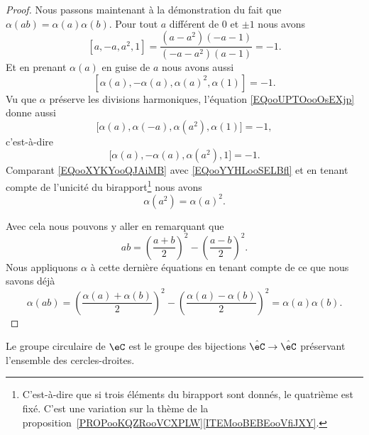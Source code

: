 \begin{proof}
	Nous passons maintenant à la démonstration du fait que \( \alpha(ab)=\alpha(a)\alpha(b)\). Pour tout \( a\) différent de \( 0\) et \( \pm 1\) nous avons
	\begin{equation}        \label{EQooUPTOooOsEXjp}
		[a,-a,a^2,1]=\frac{ (a-a^2)(-a-1) }{ (-a-a^2)(a-1) }=-1.
	\end{equation}
	Et en prenant \( \alpha(a)\) en guise de \( a\) nous avons aussi
	\begin{equation}        \label{EQooXYKYooQJAiMB}
		[\alpha(a),-\alpha(a),\alpha(a)^2,\alpha(1)]=-1.
	\end{equation}
	Vu que \( \alpha\) préserve les divisions harmoniques, l'équation \eqref{EQooUPTOooOsEXjp} donne aussi
	\begin{equation}
		\big[ \alpha(a),\alpha(-a),\alpha(a^2),\alpha(1) \big]=-1,
	\end{equation}
	c'est-à-dire
	\begin{equation}    \label{EQooYYHLooSELBfl}
		\big[ \alpha(a),-\alpha(a),\alpha(a^2),1 \big]=-1.
	\end{equation}
	Comparant \eqref{EQooXYKYooQJAiMB} avec \eqref{EQooYYHLooSELBfl} et en tenant compte de l'unicité du birapport\footnote{C'est-à-dire que si trois éléments du birapport sont donnés, le quatrième est fixé. C'est une variation sur la thème de la proposition~\ref{PROPooKQZRooVCXPLW}\ref{ITEMooBEBEooVfiJXY}.} nous avons
	\begin{equation}
		\alpha(a^2)=\alpha(a)^2.
	\end{equation}

	Avec cela nous pouvons y aller en remarquant que
	\begin{equation}
		ab=\left( \frac{ a+b }{2} \right)^2-\left( \frac{ a-b }{2} \right)^2.
	\end{equation}
	Nous appliquons \( \alpha\) à cette dernière équations en tenant compte de ce que nous savons déjà
	\begin{equation}
		\alpha(ab)=\left( \frac{ \alpha(a)+\alpha(b) }{2} \right)^2-\left( \frac{ \alpha(a)-\alpha(b) }{2} \right)^2=\alpha(a)\alpha(b).
	\end{equation}
\end{proof}

\begin{theorem}       \label{THOooKMKWooZPIDaK}
	Le groupe circulaire de \( \eC\) est le groupe des bijections \( \hat\eC\to\hat \eC\) préservant l'ensemble des cercles-droites.
\end{theorem}

